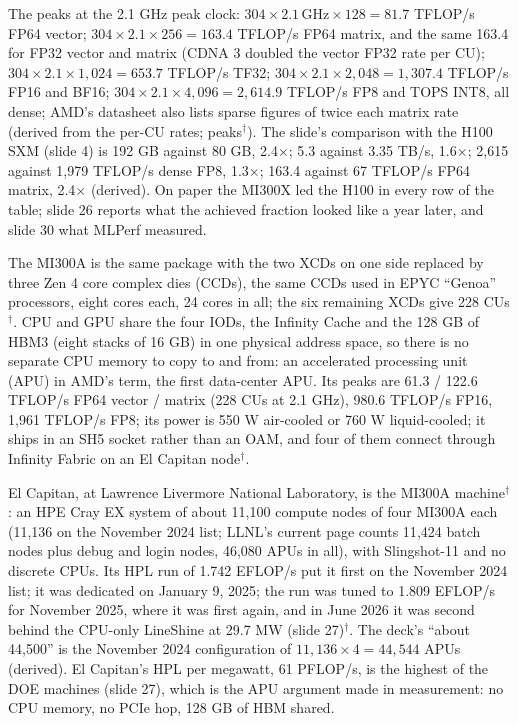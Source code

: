 \documentclass[11pt,letterpaper]{article}
\begin{document}
The peaks at the 2.1 GHz peak clock: $304 \times 2.1\,\text{GHz} \times 128 = 81.7$ TFLOP/s FP64 vector; $304 \times 2.1 \times 256 = 163.4$ TFLOP/s FP64 matrix, and the same 163.4 for FP32 vector and matrix (CDNA 3 doubled the vector FP32 rate per CU); $304 \times 2.1 \times 1{,}024 = 653.7$ TFLOP/s TF32; $304 \times 2.1 \times 2{,}048 = 1{,}307.4$ TFLOP/s FP16 and BF16; $304 \times 2.1 \times 4{,}096 = 2{,}614.9$ TFLOP/s FP8 and TOPS INT8, all dense; AMD's datasheet also lists sparse figures of twice each matrix rate (derived from the per-CU rates; peaks$^\dagger$). The slide's comparison with the H100 SXM (slide 4) is 192 GB against 80 GB, 2.4$\times$; 5.3 against 3.35 TB/s, 1.6$\times$; 2{,}615 against 1{,}979 TFLOP/s dense FP8, 1.3$\times$; 163.4 against 67 TFLOP/s FP64 matrix, 2.4$\times$ (derived). On paper the MI300X led the H100 in every row of the table; slide 26 reports what the achieved fraction looked like a year later, and slide 30 what MLPerf measured.

The MI300A is the same package with the two XCDs on one side replaced by three Zen 4 core complex dies (CCDs), the same CCDs used in EPYC ``Genoa'' processors, eight cores each, 24 cores in all; the six remaining XCDs give 228 CUs$^\dagger$. CPU and GPU share the four IODs, the Infinity Cache and the 128 GB of HBM3 (eight stacks of 16 GB) in one physical address space, so there is no separate CPU memory to copy to and from: an accelerated processing unit (APU) in AMD's term, the first data-center APU. Its peaks are 61.3 / 122.6 TFLOP/s FP64 vector / matrix (228 CUs at 2.1 GHz), 980.6 TFLOP/s FP16, 1{,}961 TFLOP/s FP8; its power is 550 W air-cooled or 760 W liquid-cooled; it ships in an SH5 socket rather than an OAM, and four of them connect through Infinity Fabric on an El Capitan node$^\dagger$.

El Capitan, at Lawrence Livermore National Laboratory, is the MI300A machine$^\dagger$: an HPE Cray EX system of about 11{,}100 compute nodes of four MI300A each (11{,}136 on the November 2024 list; LLNL's current page counts 11{,}424 batch nodes plus debug and login nodes, 46{,}080 APUs in all), with Slingshot-11 and no discrete CPUs. Its HPL run of 1.742 EFLOP/s put it first on the November 2024 list; it was dedicated on January 9, 2025; the run was tuned to 1.809 EFLOP/s for November 2025, where it was first again, and in June 2026 it was second behind the CPU-only LineShine at 29.7 MW (slide 27)$^\dagger$. The deck's ``about 44{,}500'' is the November 2024 configuration of $11{,}136 \times 4 = 44{,}544$ APUs (derived). El Capitan's HPL per megawatt, 61 PFLOP/s, is the highest of the DOE machines (slide 27), which is the APU argument made in measurement: no CPU memory, no PCIe hop, 128 GB of HBM shared.
\end{document}

